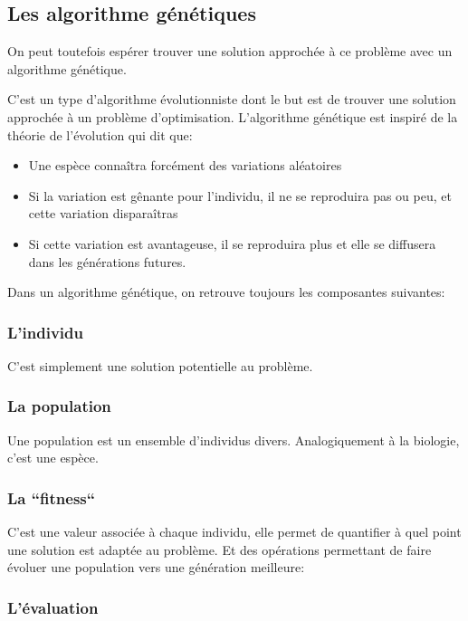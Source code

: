 \documentclass[11pt]{article}
\begin{document}
\subsection{Les algorithme génétiques}
\label{sec-1-2}

On peut toutefois espérer trouver une solution approchée à ce problème avec un algorithme génétique.

C'est un type d'algorithme évolutionniste dont le but est de trouver une solution approchée à un problème d'optimisation.
L'algorithme génétique est inspiré de la théorie de l'évolution qui dit que:
\begin{itemize}
\item Une espèce connaîtra forcément des variations aléatoires
\item Si la variation est gênante pour l'individu, il ne se reproduira pas ou peu, et cette variation disparaîtras
\item Si cette variation est avantageuse, il se reproduira plus et elle se diffusera dans les générations futures.
\end{itemize}

Dans un algorithme génétique, on retrouve toujours les composantes suivantes:

\subsubsection{L'individu}

C'est simplement une solution potentielle au problème.

\subsubsection{La population}

Une population est un ensemble d'individus divers. Analogiquement à la biologie, c'est une espèce.    

\subsubsection{La ``fitness``}

C'est une valeur associée à chaque individu, elle permet de quantifier à quel point
une solution est adaptée au problème.
Et des opérations permettant de faire évoluer une population vers une génération meilleure:

\subsubsection{L'évaluation}
\end{document}
